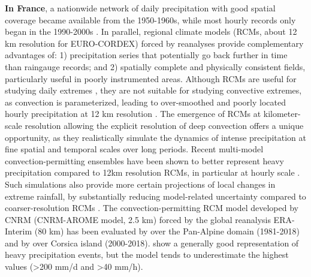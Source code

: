 \documentclass[hess, manuscript]{copernicus}
\begin{document}
\textbf{In France}, a nationwide network of daily precipitation with good spatial coverage became available from the 1950-1960s, while most hourly records only began in the 1990-2000s \citep{meteofrance2024}. In parallel, regional climate models (RCMs, about 12 km resolution for EURO-CORDEX) forced by reanalyses provide complementary advantages of: 1) precipitation series that potentially go back further in time than raingauge records; and 2) spatially complete and
physically consistent fields, particularly useful in poorly instrumented
areas. Although RCMs are useful for studying daily extremes \citep{dierickx-etal-2025,steensen-etal-2025}, they are not suitable for studying convective extremes, as convection is parameterized, leading to over-smoothed and
poorly located hourly precipitation at 12 km resolution \citep{KilometerScaleClimateModelsProspectsandChallenges}. 
The emergence of RCMs at kilometer-scale resolution allowing the explicit resolution of deep convection  offers a unique opportunity, as they realistically simulate the dynamics of intense precipitation at fine spatial and temporal scales over long periods. Recent multi-model convection-permitting ensembles have been shown to better represent heavy precipitation  compared to 12km resolution RCMs, in particular at hourly scale  \citep{ban-etal-2021,pichelli-etal-2021,berthou-etal-2020}. Such simulations also provide more certain projections of local changes in extreme rainfall, by substantially reducing model-related uncertainty compared to coarser-resolution RCMs \citep{Fosser2024}. The convection-permitting RCM model developed by CNRM (CNRM-AROME model, 2.5 km) forced by the global reanalysis ERA-Interim (80 km) has been evaluated by \cite{Caillaud2021} over the Pan-Alpine domain (1981-2018) and by \cite{Cortes-Hernandez2024} over Corsica island (2000-2018). \cite{Caillaud2021} show a generally good representation of heavy precipitation events, but the model tends to underestimate the highest values (>200 mm/d and >40 mm/h).
\end{document}
